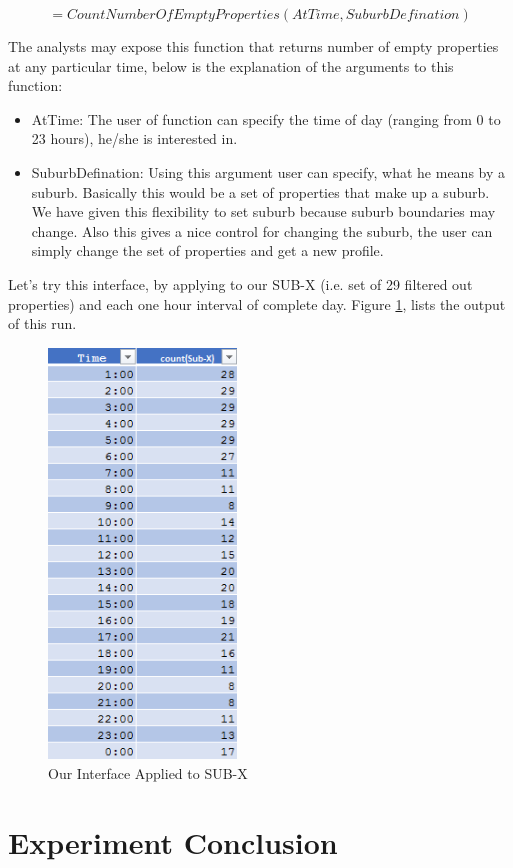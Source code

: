 \documentclass[12pt]{report}
\theoremstyle{named}
\begin{document}
\[=CountNumberOfEmptyProperties(AtTime,SuburbDefination)\]

The analysts may expose this function that returns number of empty properties at any particular time, below is the explanation of the arguments to this function:

\begin{itemize}
  \item AtTime: The user of function can specify the time of day (ranging from 0 to 23 hours), he/she is interested in.
  \item SuburbDefination: Using this argument user can specify, what he means by a suburb. Basically this would be a set of properties that make up a suburb. We have given this flexibility to set suburb because suburb boundaries may change. Also this gives a nice control for changing the suburb, the user can simply change the set of properties and get a new profile.
\end{itemize}

Let's try this interface, by applying to our SUB-X (i.e. set of 29 filtered out properties) and each one hour interval of complete day. Figure \ref{fig:InterfaceRun}, lists the output of this run.
\begin{figure}[ht]
\centering
        \includegraphics[width=50mm,scale=1]{Images/InterfaceRun.PNG}
    \caption{Our Interface Applied to SUB-X}
    \label{fig:InterfaceRun}
\end{figure}

\section{Experiment Conclusion}
\end{document}
